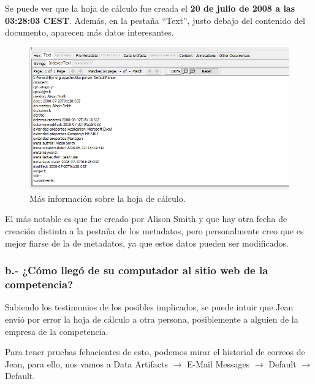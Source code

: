 \documentclass{article}
\begin{document}
Se puede ver que la hoja de cálculo fue creada el \textbf{20 de julio de 2008 a las 03:28:03 CEST}. Además, en la pestaña ``Text'', justo debajo del contenido del documento, aparecen más datos interesantes.

\begin{figure}[H]
    \centering
    \includegraphics[width=\textwidth]{imagenes/Windows/Captura de pantalla (7).png}
    \caption{Más información sobre la hoja de cálculo.}
\end{figure}

El más notable es que fue creado por Alison Smith y que hay otra fecha de creación distinta a la pestaña de los metadatos, pero personalmente creo que es mejor fiarse de la de metadatos, ya que estos datos pueden ser modificados.

\newpage

\subsubsection{b.- ¿Cómo llegó de su computador al sitio web de la competencia?}

Sabiendo los testimonios de los posibles implicados, se puede intuir que Jean envió por error la hoja de cálculo a otra persona, posiblemente a alguien de la empresa de la competencia.

\bigskip

Para tener pruebas fehacientes de esto, podemos mirar el historial de correos de Jean, para ello, nos vamos a Data Artifacts $\rightarrow$ E-Mail Messages $\rightarrow$ Default $\rightarrow$ Default.
\end{document}
